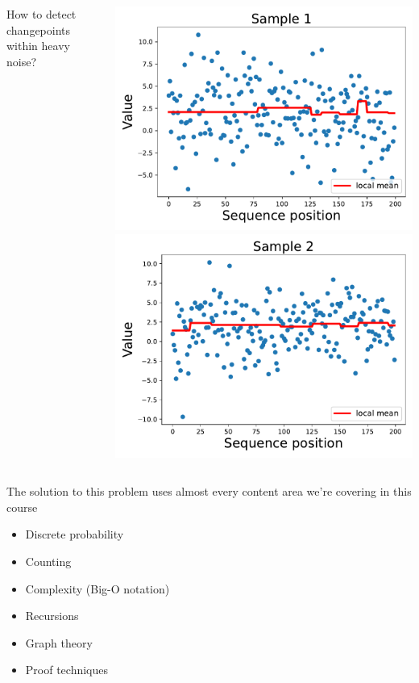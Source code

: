 \documentclass[t, aspectratio = 137, xcolor=dvipsnames,table,compress]{beamer}
\begin{document}
\begin{frame}
\begin{columns}[T,onlytextwidth]
    \begin{column}{0.4\textwidth}
        \centering
        \vspace{1in}
        \Large How to detect changepoints within heavy noise?
     \end{column}
    \begin{column}{0.6\textwidth}	
	 \begin{center}
	  \includegraphics[width=0.5\linewidth]{images/sample_0} \\
	\includegraphics[width=0.5\linewidth]{images/sample_1}
	\end{center}
    \end{column}
\end{columns}

\end{frame}


\begin{frame}

\large \centering
The solution to this problem uses almost every content area we're covering in this course

\vfill 
\begin{itemize}
	\item Discrete probability 
	\item Counting
	\item Complexity (Big-O notation)
	\item Recursions
	\item Graph theory
	\item Proof techniques
\end{itemize}
\end{frame}
\end{document}
